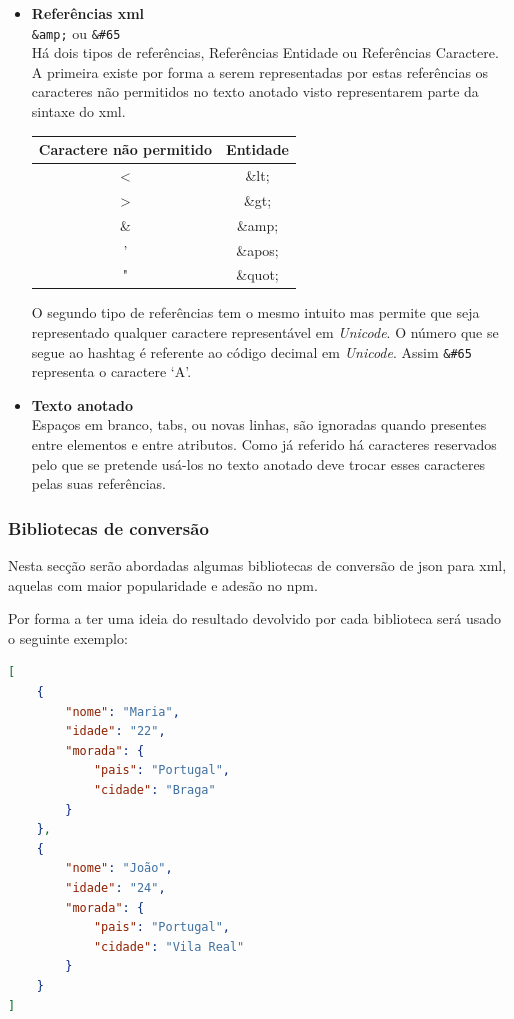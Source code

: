 \begin{itemize}
\begin{itemize}
    \end{itemize}
    \item \textbf{Referências \acrshort{xml}} \\
    \verb|&amp;| ou \verb|&#65| \\
    Há dois tipos de referências, Referências Entidade ou Referências Caractere. A primeira existe por forma a serem representadas por estas referências os caracteres não permitidos no texto anotado visto representarem parte da sintaxe do \acrshort{xml}.
    \begin{center}
        \begin{tabular}{|c|c|}
            \hline
            Caractere não permitido & Entidade \\ \hline
            < & \&lt; \\ \hline
            > & \&gt; \\ \hline
            \& & \&amp; \\ \hline
            ' & \&apos; \\ \hline
            " & \&quot; \\ \hline
        \end{tabular}
    \end{center}
    O segundo tipo de referências tem o mesmo intuito mas permite que seja representado qualquer caractere representável em \textit{Unicode}. O número que se segue ao hashtag é referente ao código decimal em \textit{Unicode}. Assim \verb|&#65| representa o caractere `A'.
    \item \textbf{Texto anotado} \\
    Espaços em branco, tabs, ou novas linhas, são ignoradas quando presentes entre elementos e entre atributos. Como já referido há caracteres reservados pelo que se pretende usá-los no texto anotado deve trocar esses caracteres pelas suas referências.
\end{itemize}

\subsubsection{Bibliotecas de conversão}

Nesta secção serão abordadas algumas bibliotecas de conversão de \acrshort{json} para \acrshort{xml}, aquelas com maior popularidade e adesão no \acrshort{npm}.

Por forma a ter uma ideia do resultado devolvido por cada biblioteca será usado o seguinte exemplo:
\begin{lstlisting}[language=json, caption=Exemplo em \acrshort{json} a converter, label=exem:jsonBib]
[
    {
        "nome": "Maria",
        "idade": "22",
        "morada": {
            "pais": "Portugal",
            "cidade": "Braga"
        }
    },
    {
        "nome": "João",
        "idade": "24",
        "morada": {
            "pais": "Portugal",
            "cidade": "Vila Real"
        }
    }
]
\end{lstlisting}

